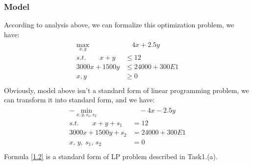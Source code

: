 \documentclass[titlepage,a4paper]{article}
\begin{document}
        \subsubsection{Model}
            According to analysis above, we can formalize  this optimization problem, we have:
            \begin{align}\label{1.1}
            \begin{split}  
                \max_{x,y} &\quad 4x + 2.5y \\
                s.t.\qquad x + y &\leq 12 \\
                3000x + 1500y &\leq 24000 + 300E1 \\
                x,y &\geq 0 \\
            \end{split}    
            \end{align}      
            Obviously, model above isn't a standard form of linear programming problem, we can transform it into standard form, and we have:
            \begin{align}\label{1.2}
            \begin{split}  
                -\min_{x,y,s_1,s_2} &\quad -4x - 2.5y \\
                s.t.\qquad x + y + s_1 &= 12 \\
                3000x + 1500y +s_2 &= 24000 + 300E1 \\
                x,\,y,\:s_1,\,s_2 &= 0 \\
            \end{split}    
            \end{align}      
            Formula \eqref{1.2} is a standard form of LP problem described in Task1.(a).
\end{document}
